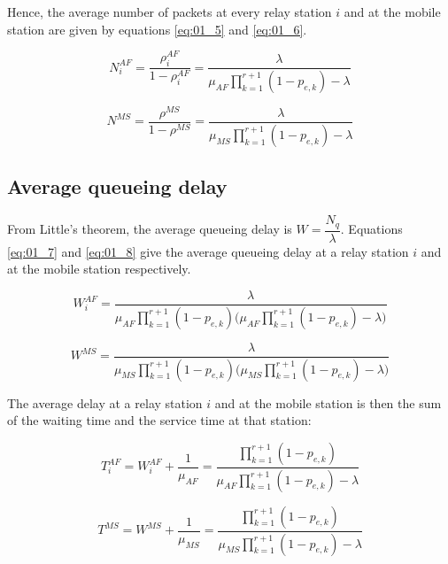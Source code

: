 Hence, the average number of packets at every relay station $i$ and at the
mobile station are given by equations \ref{eq:01_5} and \ref{eq:01_6}.

\begin{equation}
  N_i^{AF} = \dfrac{\rho_i^{AF}}{1 - \rho_i^{AF}} = \dfrac{\lambda}{\mu_{AF}\prod\limits_{k=1}^{r+1} (1 - p_{e,k}) - \lambda}
  \label{eq:01_5}
\end{equation}

\begin{equation}
  N^{MS} =  \dfrac{\rho^{MS}}{1 - \rho^{MS}} = \dfrac{\lambda}{\mu_{MS}\prod\limits_{k=1}^{r+1} (1 - p_{e,k}) - \lambda}
  \label{eq:01_6}
\end{equation}


\subsection{Average queueing delay}
From Little's theorem, the average queueing delay is $W = \dfrac{N_q}{\lambda}$.
Equations \ref{eq:01_7} and \ref{eq:01_8} give the average queueing delay at a
relay station $i$ and at the mobile station respectively.

\begin{equation}
  W_i^{AF} = \dfrac{\lambda}{\mu_{AF} \prod\limits_{k=1}^{r+1} (1 - p_{e,k})\Big(\mu_{AF}\prod\limits_{k=1}^{r+1} (1 - p_{e,k}) - \lambda\Big)}
  \label{eq:01_7}
\end{equation}

\begin{equation}
  W^{MS} = \dfrac{\lambda}{\mu_{MS} \prod\limits_{k=1}^{r+1} (1 - p_{e,k})\Big(\mu_{MS}\prod\limits_{k=1}^{r+1} (1 - p_{e,k}) - \lambda\Big)}
  \label{eq:01_8}
\end{equation}


The average delay at a relay station $i$ and at the mobile station is then the
sum of the waiting time and the service time at that station:

\begin{equation}
  T_i^{AF} = W_i^{AF} + \dfrac{1}{\mu_{AF}} =
  \dfrac{\prod\limits_{k=1}^{r+1} (1 - p_{e,k})}{\mu_{AF}\prod\limits_{k=1}^{r+1} (1 - p_{e,k}) -\lambda}
  \label{eq:01_9}
\end{equation}

\begin{equation}
  T^{MS} = W^{MS} + \dfrac{1}{\mu_{MS}} =
  \dfrac{\prod\limits_{k=1}^{r+1} (1 - p_{e,k})}{\mu_{MS}\prod\limits_{k=1}^{r+1} (1 - p_{e,k}) -\lambda}
  \label{eq:01_10}
\end{equation}


